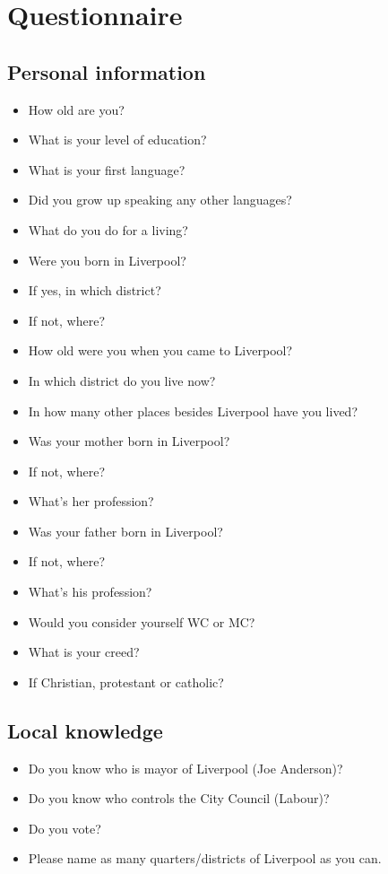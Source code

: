 \chapter{Questionnaire}
	\label{app.questionnaire}
	
	\section*{Personal information}
		\begin{multicols}{2}
		\begin{itemize}
			\item How old are you?
			\item What is your level of education? 
			\item What is your first language?
			\item Did you grow up speaking any other languages?
			\item What do you do for a living?
			\item Were you born in Liverpool?
			\item If yes, in which district?
			\item If not, where?
			\item How old were you when you came to Liverpool?
			\item In which district do you live now?
			\item In how many other places besides Liverpool have you lived?
			\item Was your mother born in Liverpool?
			\item If not, where?
			\item What's her profession?
			\item Was your father born in Liverpool?
			\item If not, where?
			\item What's his profession?
			\item Would you consider yourself WC or MC?
			\item What is your creed?
			\item If Christian, protestant or catholic?
		\end{itemize}
	\end{multicols}
	
	\section*{Local knowledge}
	\begin{multicols}{2}
		\begin{itemize}
			\item Do you know who is mayor of Liverpool (Joe Anderson)?
			\item Do you know who controls the City Council (Labour)?
			\item Do you vote?
			\item Please name as many quarters/districts of Liverpool as you can.
		\end{itemize}
	\end{multicols}
	
